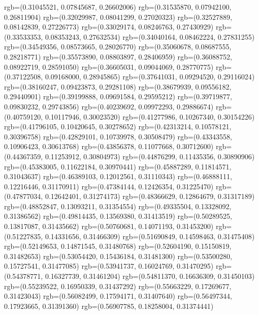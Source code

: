 {{        rgb=(0.31045521, 0.07845687, 0.26602006)
        rgb=(0.31535870, 0.07942100, 0.26811904)
        rgb=(0.32029987, 0.08041299, 0.27020323)
        rgb=(0.32527889, 0.08142839, 0.27226773)
        rgb=(0.33029174, 0.08246763, 0.27430929)
        rgb=(0.33533353, 0.08353243, 0.27632534)
        rgb=(0.34040164, 0.08462224, 0.27831255)
        rgb=(0.34549356, 0.08573665, 0.28026770)
        rgb=(0.35060678, 0.08687555, 0.28218771)
        rgb=(0.35573890, 0.08803897, 0.28406959)
        rgb=(0.36088752, 0.08922719, 0.28591050)
        rgb=(0.36605031, 0.09044069, 0.28770775)
        rgb=(0.37122508, 0.09168000, 0.28945865)
        rgb=(0.37641031, 0.09294520, 0.29116024)
        rgb=(0.38160247, 0.09423873, 0.29281108)
        rgb=(0.38679939, 0.09556182, 0.29440901)
        rgb=(0.39199888, 0.09691584, 0.29595212)
        rgb=(0.39719877, 0.09830232, 0.29743856)
        rgb=(0.40239692, 0.09972293, 0.29886674)
        rgb=(0.40759120, 0.10117946, 0.30023520)
        rgb=(0.41277986, 0.10267340, 0.30154226)
        rgb=(0.41796105, 0.10420645, 0.30278652)
        rgb=(0.42313214, 0.10578121, 0.30396758)
        rgb=(0.42829101, 0.10739978, 0.30508479)
        rgb=(0.43343558, 0.10906423, 0.30613768)
        rgb=(0.43856378, 0.11077668, 0.30712600)
        rgb=(0.44367359, 0.11253912, 0.30804973)
        rgb=(0.44876299, 0.11435356, 0.30890906)
        rgb=(0.45383005, 0.11622184, 0.30970441)
        rgb=(0.45887289, 0.11814571, 0.31043637)
        rgb=(0.46389103, 0.12012561, 0.31110343)
        rgb=(0.46888111, 0.12216446, 0.31170911)
        rgb=(0.47384144, 0.12426354, 0.31225470)
        rgb=(0.47877034, 0.12642401, 0.31274173)
        rgb=(0.48366629, 0.12864679, 0.31317189)
        rgb=(0.48852847, 0.13093211, 0.31354554)
        rgb=(0.49335504, 0.13328092, 0.31386562)
        rgb=(0.49814435, 0.13569380, 0.31413519)
        rgb=(0.50289525, 0.13817087, 0.31435662)
        rgb=(0.50760681, 0.14071193, 0.31453200)
        rgb=(0.51227835, 0.14331656, 0.31466309)
        rgb=(0.51690849, 0.14598463, 0.31475408)
        rgb=(0.52149653, 0.14871545, 0.31480768)
        rgb=(0.52604190, 0.15150819, 0.31482653)
        rgb=(0.53054420, 0.15436184, 0.31481300)
        rgb=(0.53500280, 0.15727541, 0.31477085)
        rgb=(0.53941737, 0.16024769, 0.31470295)
        rgb=(0.54378771, 0.16327739, 0.31461204)
        rgb=(0.54811370, 0.16636309, 0.31450103)
        rgb=(0.55239522, 0.16950339, 0.31437292)
        rgb=(0.55663229, 0.17269677, 0.31423043)
        rgb=(0.56082499, 0.17594171, 0.31407640)
        rgb=(0.56497344, 0.17923665, 0.31391360)
        rgb=(0.56907785, 0.18258004, 0.31374441)
}}
